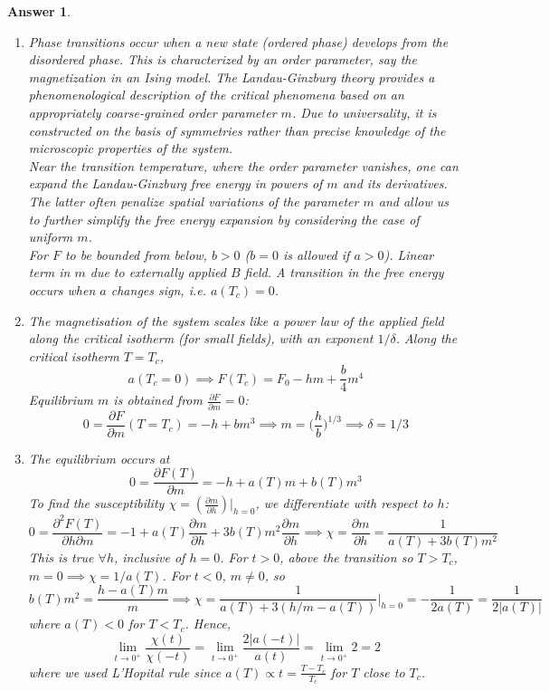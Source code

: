 \documentclass[a4paper]{article}
\newtheorem{ans}{Answer}[section]
\theoremstyle{new}
\begin{document}
\begin{ans}\leavevmode
\begin{enumerate}[label=(\alph*)]
\item Phase transitions occur when a new state (ordered phase) develops from the disordered phase. This is characterized by an order parameter, say the magnetization in an Ising model. The Landau-Ginzburg theory provides a phenomenological description of the critical phenomena based on an appropriately coarse-grained order parameter $m$. Due to universality, it is constructed on the basis of symmetries rather than precise knowledge of the microscopic properties of the system.\\[5pt]
Near the transition temperature, where the order parameter vanishes, one can expand the Landau-Ginzburg free energy in powers of $m$ and its derivatives. The latter often penalize spatial variations of the parameter $m$ and allow us to further simplify the free energy expansion by considering the case of uniform $m$.\\[5pt]
For $F$ to be bounded from below, $b>0$ ($b=0$ is allowed if $a>0$). Linear term in $m$ due to externally applied $B$ field. A transition in the free energy occurs when $a$ changes sign, i.e. $a(T_c)=0$.
\item The magnetisation of the system scales like a power law of the applied field along the critical isotherm (for small fields), with an exponent $1/\delta$. Along the critical isotherm $T=T_c$,
$$a(T_c=0)\implies F(T_c)=F_0-hm+\frac{b}{4}m^4$$
Equilibrium $m$ is obtained from $\frac{\partial F}{\partial m}=0$:
$$0=\frac{\partial F}{\partial m}(T=T_c)=-h+bm^3\implies m=\bigg(\frac{h}{b}\bigg)^{1/3}\implies\delta=1/3$$
\item The equilibrium occurs at
$$0=\frac{\partial F(T)}{\partial m}=-h+a(T)m+b(T)m^3$$
To find the susceptibility $\chi=(\frac{\partial m}{\partial h})|_{h=0}$, we differentiate with respect to $h$:
$$0=\frac{\partial^2F(T)}{\partial h\partial m}=-1+a(T)\frac{\partial m}{\partial h}+3b(T)m^2\frac{\partial m}{\partial h}\implies\chi=\frac{\partial m}{\partial h}=\frac{1}{a(T)+3b(T)m^2}$$
This is true $\forall h$, inclusive of $h=0$. For $t>0$, above the transition so $T>T_c$, $m=0\implies\chi=1/a(T)$. For $t<0$, $m\neq 0$, so
$$b(T)m^2=\frac{h-a(T)m}{m}\implies\chi=\frac{1}{a(T)+3(h/m-a(T))}\bigg|_{h=0}=-\frac{1}{2a(T)}=\frac{1}{2|a(T)|}$$
where $a(T)<0$ for $T<T_c$. Hence,
$$\lim_{t\rightarrow 0^+}\frac{\chi(t)}{\chi(-t)}=\lim_{t\rightarrow 0^+}\frac{2|a(-t)|}{a(t)}=\lim_{t\rightarrow 0^+}2=2$$
where we used L'Hopital rule since $a(T)\propto t=\frac{T-T_c}{T_c}$ for $T$ close to $T_c$.

\end{enumerate}
\end{ans}
\end{document}
